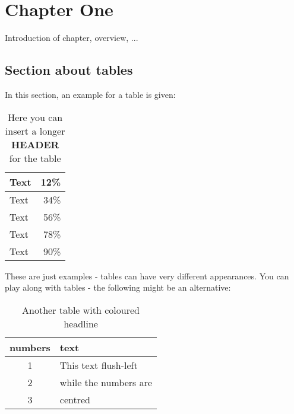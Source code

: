 
\chapter{Chapter One} %
\label{cha:chapter_one}

Introduction of chapter, overview, ...


\section{Section about tables} %
\label{sec:section_about_tables}

In this section, an example for a table is given:

\begin{table}[ht]
	\centering
	\caption[Short title Exampletable]{Here you can insert a longer \textbf{HEADER} for the table}
		\vspace{1.0em}
		\begin{tabular}{|l|r|}
\hline
Text & 12\% \\
\hline
Text & 34\% \\
\hline
Text & 56\% \\
\hline
Text & 78\% \\
\hline
Text & 90\% \\
\hline
		\end{tabular}
	\label{tab:tableexample}
\end{table}



These are just examples - tables can have very different appearances. You can play along with tables - the following might be an alternative:

\begin{table}[ht]
	\centering
	\caption[Alternative Table]{Another table with coloured headline}
		\vspace{1.0em}	
	\begin{tabular}{|c|l|}
		\hline
		\rowcolor[gray]{0.9}\textbf{numbers} & \textbf{text} \\
		\hline
		\hline
		1 & This text flush-left \\
		\hline
		2 & while the numbers are \\
		\hline
		3 & centred \\
		\hline
	\end{tabular}
	\label{tab:tablealternative}
\end{table}


